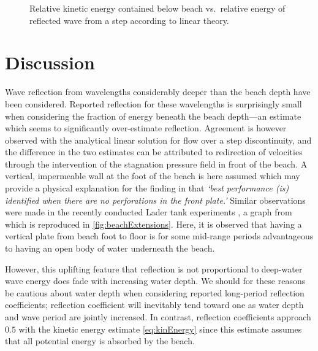 \documentclass[internal]{sintefmemo}
\renewcommand{\_}[1]{_\mr{#1}}
\begin{document}
\begin{figure}[h!ptb]%
\centering
{}%
\hfill
{}%
\caption{Relative kinetic energy contained below beach vs.\ relative energy of reflected wave from a step according to linear theory.}%
\label{fig:estimates}%
\end{figure}

\section{Discussion}
Wave reflection from wavelengths considerably deeper than the beach depth have been considered.
Reported reflection for these wavelengths is surprisingly small when considering the fraction of energy beneath the beach depth---an estimate which seems to significantly over-estimate reflection.
Agreement is however observed with the analytical linear solution for flow over a step discontinuity, and the difference in the two estimates can be attributed to redirection of velocities through the intervention of the stagnation pressure field in front of the beach. 
A vertical, impermeable wall at the foot of the beach is here assumed which may provide a physical explanation for the finding in \citet{tiedeman2012} that \textit{`best performance (is) identified when there are no perforations in the front plate.'}
Similar observations were made in the recently conducted Lader tank experiments \citep{AHA2022Lader}, a graph from which is reproduced in \cref{fig:beachExtensions}.
Here, it is observed that having a vertical plate from beach foot to floor is for some mid-range periods advantageous to having an open body of water underneath the beach.

However, this uplifting feature that reflection is not proportional to deep-water wave energy does fade with increasing water depth. 
We should for these reasons be cautious about water depth when considering reported long-period reflection coefficients; 
reflection coefficient will inevitably tend toward one as water depth and wave period are jointly increased.
In contrast, reflection coefficients approach $0.5$ with the kinetic energy estimate \eqref{eq:kinEnergy} since this estimate assumes that all potential energy is absorbed by the beach.
\end{document}
